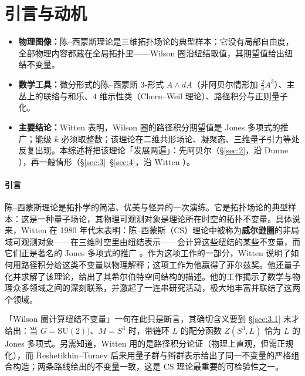 \section{引言与动机}\label{sec:1}

\begin{keytakeaways}
\begin{itemize}[leftmargin=1.4em,itemsep=2pt,topsep=2pt]
  \item \textbf{物理图像：}陈--西蒙斯理论是三维拓扑场论的典型样本：它没有局部自由度，全部物理内容都藏在全局拓扑里——Wilson 圈沿纽结取值，其期望值给出纽结不变量。
  \item \textbf{数学工具：}微分形式的陈--西蒙斯 $3$-形式 $A\wedge dA$（非阿贝尔情形加 $\frac{2}{3}A^3$）、主丛上的联络与和乐、$4$ 维示性类（Chern--Weil 理论）、路径积分与正则量子化。
  \item \textbf{主要结论：}Witten 表明，Wilson 圈的路径积分期望值是 Jones 多项式的推广；能级 $k$ 必须取整数；该理论在二维共形场论、凝聚态、三维量子引力等处反复出现。本综述将把该理论「发展两遍」：先阿贝尔（\S\ref{sec:2}，沿 Dunne \cite{dunne}），再一般情形（\S\ref{sec:3}--\S\ref{sec:4}，沿 Witten \cite{witten1989}）。
\end{itemize}
\end{keytakeaways}

\paragraph{引言}
陈--西蒙斯理论是拓扑学的简洁、优美与怪异的一次演练。它是拓扑场论的典型样本：这是一种量子场论，其物理可观测对象是理论所在时空的拓扑不变量。具体说来，Witten 在 1980 年代末表明：陈--西蒙斯（CS）理论中被称为\textbf{威尔逊圈}的非局域可观测对象——在三维时空里由纽结表示——会计算这些纽结的某些不变量，而它们正是著名的 Jones 多项式的推广 \cite{witten1989}。作为这项工作的一部分，Witten 说明了如何用路径积分给这类不变量以物理解释；这项工作为他赢得了菲尔兹奖。他还量子化并求解了该理论，给出了其希尔伯特空间结构的描述。他的工作揭示了数学与物理众多领域之间的深刻联系，并激起了一连串研究活动，极大地丰富并联结了这两个领域。

\begin{yizhu}[含糊点]
「Wilson 圈计算纽结不变量」一句在此只是断言，其确切含义要到 \S\ref{sec:3.1} 末才给出：当 $G=\mathrm{SU}(2))$、$M=S^3$ 时，带链环 $L$ 的配分函数 $Z(S^3,L)$ 恰为 $L$ 的 Jones 多项式。另需知道，Witten 用的是路径积分论证（物理上直观，但需正规化），而 Reshetikhin--Turaev 后来用量子群与辫群表示给出了同一不变量的严格组合构造；两条路线给出的不变量一致，这是 CS 理论最重要的可检验性之一。
\end{yizhu}

